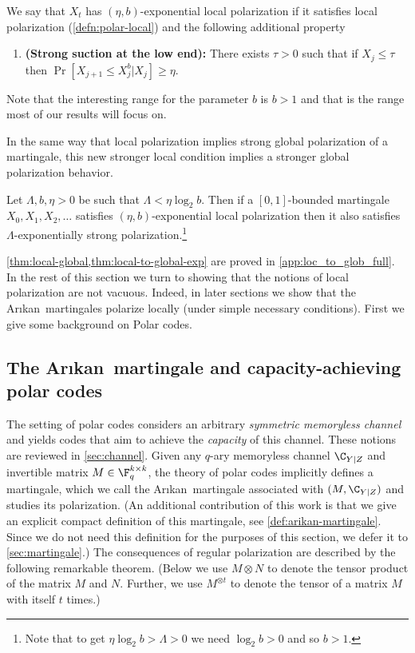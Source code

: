 \documentclass[11pt]{article}
\newcommand{\Arikan}{Ar\i kan}
\begin{document}
\begin{definition}\label{defn:polar-local-exp}
	We say that $X_t$ has $(\eta, b)$-exponential local polarization 
	if it satisfies local polarization (\cref{defn:polar-local}) and the following additional property
	\begin{enumerate}
		\item {\bf(Strong suction at the low end):} There exists $\tau > 0$ such that if $X_j \leq \tau$ then
		$\Pr[X_{j+1} \leq X_j^{b} | X_j] \geq \eta$.
	\end{enumerate}
\end{definition}

Note that the interesting range for the parameter $b$ is $b > 1$ and that is the range most of our results will focus on.

In the same way that local polarization implies strong global polarization of a martingale, this new stronger local condition implies a stronger global polarization behavior.

\begin{theorem}
	\label{thm:local-to-global-exp}
	Let $\Lambda,b, \eta >0$ be such that $\Lambda < \eta \log_2 b$.  
	Then if a $[0,1]$-bounded martingale $X_0,X_1,X_2,\ldots$ satisfies $(\eta, b)$-exponential local polarization then it also satisfies $\Lambda$-exponentially strong polarization.\footnote{Note that to get $\eta \log_2 b > \Lambda > 0$ we need $\log_2 b > 0$ and so $b > 1$.}
\end{theorem}

\cref{thm:local-global,thm:local-to-global-exp} are proved in \cref{app:loc_to_glob_full}. 
In the rest of this section we turn to showing that 
the notions of local polarization are not vacuous. Indeed, in later sections we show that the \Arikan\ martingales polarize locally (under simple necessary conditions). First we give some background on Polar codes.


\subsection{The \Arikan\ martingale and capacity-achieving polar codes}
\label{ssec:intro-arikan}

The setting of polar codes considers an arbitrary {\em symmetric memoryless
	channel} and yields codes that aim to achieve the {\em capacity} of this
channel. These notions are reviewed in \cref{sec:channel}.
Given any $q$-ary memoryless channel $\C_{Y|Z}$ and invertible matrix $M \in \F_q^{k \times k}$, the theory of polar codes implicitly defines a martingale, which we call the \Arikan\ martingale associated with $(M,\C_{Y|Z})$ and studies its polarization. (An additional contribution of this work is that we give an explicit compact definition of this martingale, see \cref{def:arikan-martingale}. Since we do not need this definition for the purposes of this section, we defer it to \cref{sec:martingale}.) The consequences of regular polarization are described by the following remarkable theorem. (Below we use $M\otimes N$ to denote the tensor product of the matrix $M$ and $N$. Further, we use $M^{\otimes t}$ to denote the tensor of a matrix $M$ with itself $t$ times.)
\end{document}
